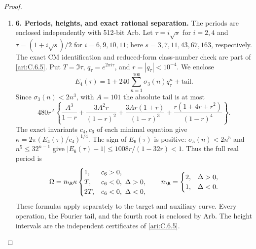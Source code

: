 \begin{proof}
\begin{enumerate}[label=\arabic*.,leftmargin=*]
\item \textbf{6. Periods, heights, and exact rational separation.}
The periods are enclosed independently with 512-bit Arb. Let
$\tau=i\sqrt s$ for $i=2,4$ and
$\tau=(1+i\sqrt s)/2$ for $i=6,9,10,11$; here
$s=3,7,11,43,67,163$, respectively. The exact CM identification
and reduced-form class-number check are part of \ref{ari:C.6.5}. Put
$T=\Im\tau$, $q_\tau=e^{2\pi i\tau}$, and
$r=|q_\tau|<10^{-4}$. We enclose
\[
 E_4(\tau)=1+240\sum_{n=1}^{100}\sigma_3(n)q_\tau^n
                   +\text{tail}.
\]
Since $\sigma_3(n)<2n^3$, with $A=101$ the absolute tail is at most
\[
 480r^A\left\{
 \frac{A^3}{1-r}+\frac{3A^2r}{(1-r)^2}
 +\frac{3Ar(1+r)}{(1-r)^3}
 +\frac{r(1+4r+r^2)}{(1-r)^4}\right\}.
\]
The exact invariants $c_4,c_6$ of each minimal equation give
$\kappa=2\pi(E_4(\tau)/c_4)^{1/4}$. The sign of $E_6(\tau)$
is positive: $\sigma_5(n)<2n^5$ and
$n^5\leq32^{n-1}$ give
$|E_6(\tau)-1|\leq1008r/(1-32r)<1$.
Thus the full real period is
\[
 \Omega=n_{\R}\kappa\begin{cases}
 1,&c_6>0,\\
 T,&c_6<0,\ \Delta>0,\\
 2T,&c_6<0,\ \Delta<0,
 \end{cases}
 \qquad n_{\R}=\begin{cases}2,&\Delta>0,\\1,&\Delta<0.\end{cases}
\]
These formulas apply separately to the target and auxiliary curve.
Every operation, the Fourier tail, and the fourth root is enclosed
by Arb. The height intervals are the independent certificates
 of \ref{ari:C.6.5}.


\end{enumerate}
\end{proof}

